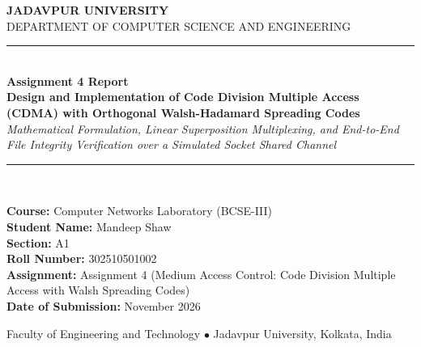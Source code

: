 \documentclass[11pt,a4paper]{article}
\begin{document}
\hypersetup{pageanchor=false}
\begin{titlepage}
    \centering
    \vspace*{1.2cm}
    
    {\Large \textbf{JADAVPUR UNIVERSITY}}\\[0.3cm]
    {\large DEPARTMENT OF COMPUTER SCIENCE AND ENGINEERING}\\[1.8cm]
    
    \rule{\linewidth}{1.2pt}\\[0.4cm]
    {\huge \textbf{Assignment 4 Report}}\\[0.3cm]
    {\LARGE \textbf{Design and Implementation of Code Division Multiple Access (CDMA) with Orthogonal Walsh-Hadamard Spreading Codes}}\\[0.3cm]
    {\large \textit{Mathematical Formulation, Linear Superposition Multiplexing, and End-to-End File Integrity Verification over a Simulated Socket Shared Channel}}\\[0.3cm]
    \rule{\linewidth}{1.2pt}\\[1.8cm]
    
    \begin{minipage}[t]{0.88\textwidth}
        \large
        \textbf{Course:} Computer Networks Laboratory (BCSE-III)\\[0.25cm]
        \textbf{Student Name:} Mandeep Shaw\\[0.25cm]
        \textbf{Section:} A1\\[0.25cm]
        \textbf{Roll Number:} 302510501002\\[0.25cm]
        \textbf{Assignment:} Assignment 4 (Medium Access Control: Code Division Multiple Access with Walsh Spreading Codes)\\[0.25cm]
        \textbf{Date of Submission:} November 2026
    \end{minipage}
    
    \vfill
    {\small Faculty of Engineering and Technology $\bullet$ Jadavpur University, Kolkata, India}
    \vspace*{0.8cm}
\end{titlepage}

\hypersetup{pageanchor=true}
\tableofcontents
\newpage
{}
\setcounter{page}{1}
\end{document}
